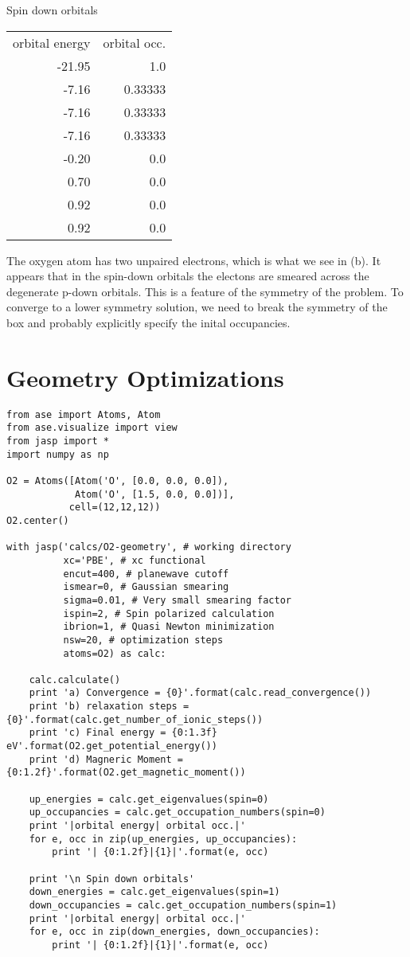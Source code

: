 \documentclass[11pt]{article}
\begin{document}
Spin down orbitals
\begin{center}
\begin{tabular}{rr}
orbital energy & orbital occ.\\
-21.95 & 1.0\\
-7.16 & 0.33333\\
-7.16 & 0.33333\\
-7.16 & 0.33333\\
-0.20 & 0.0\\
0.70 & 0.0\\
0.92 & 0.0\\
0.92 & 0.0\\
\end{tabular}
\end{center}

The oxygen atom has two unpaired electrons, which is what we see in (b). It appears that in the spin-down orbitals the electons are smeared across the degenerate p-down orbitals. This is a feature of the symmetry of the problem. To converge to a lower symmetry solution, we need to break the symmetry of the box and probably explicitly specify the inital occupancies.





\section{Geometry Optimizations}
\label{sec-4}

\begin{verbatim}
from ase import Atoms, Atom
from ase.visualize import view
from jasp import *
import numpy as np

O2 = Atoms([Atom('O', [0.0, 0.0, 0.0]),
            Atom('O', [1.5, 0.0, 0.0])],
           cell=(12,12,12))
O2.center()

with jasp('calcs/O2-geometry', # working directory
          xc='PBE', # xc functional
          encut=400, # planewave cutoff
          ismear=0, # Gaussian smearing
          sigma=0.01, # Very small smearing factor
          ispin=2, # Spin polarized calculation
          ibrion=1, # Quasi Newton minimization
          nsw=20, # optimization steps
          atoms=O2) as calc:

    calc.calculate()
    print 'a) Convergence = {0}'.format(calc.read_convergence())
    print 'b) relaxation steps = {0}'.format(calc.get_number_of_ionic_steps())
    print 'c) Final energy = {0:1.3f} eV'.format(O2.get_potential_energy())
    print 'd) Magneric Moment = {0:1.2f}'.format(O2.get_magnetic_moment())

    up_energies = calc.get_eigenvalues(spin=0)
    up_occupancies = calc.get_occupation_numbers(spin=0)
    print '|orbital energy| orbital occ.|'
    for e, occ in zip(up_energies, up_occupancies):
        print '| {0:1.2f}|{1}|'.format(e, occ)

    print '\n Spin down orbitals'
    down_energies = calc.get_eigenvalues(spin=1)
    down_occupancies = calc.get_occupation_numbers(spin=1)
    print '|orbital energy| orbital occ.|'
    for e, occ in zip(down_energies, down_occupancies):
        print '| {0:1.2f}|{1}|'.format(e, occ)
\end{verbatim}
\end{document}
